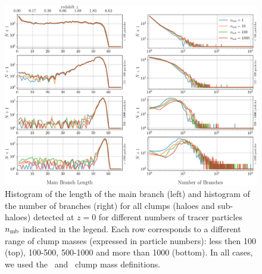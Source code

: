 \begin{figure}
  \centering
  \includegraphics[width=\textwidth, keepaspectratio]{images/tree-statistics-my-threshold/tree_geometry-ntrace.png}%
  \caption{ Histogram of the length of the main branch (left) and
    histogram of the number of branches (right) for all clumps (haloes
    and sub-haloes) detected at $z=0$ for different numbers of tracer
    particles $n_{\rm mb}$ indicated in the legend.  Each row
    corresponds to a different range of clump masses (expressed in
    particle numbers): less then 100 (top), 100-500, 500-1000 and more
    than 1000 (bottom).  In all cases, we used the \exc\ and
    \sad\ clump mass definitions.
  }%
  \label{fig:ntracers_mbl_nbranch}
\end{figure}

